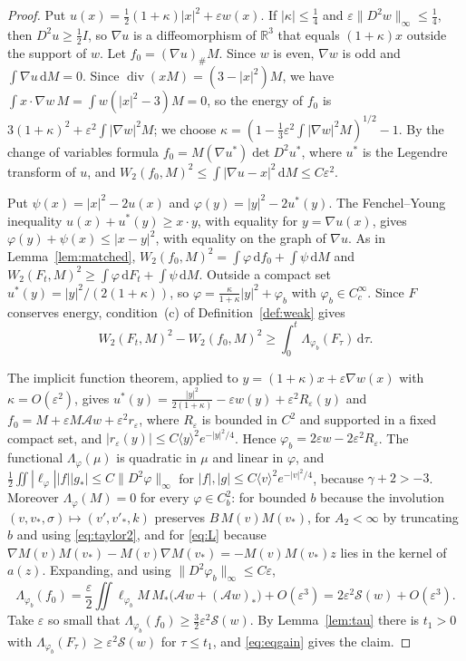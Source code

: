 \documentclass[11pt]{amsart}
\theoremstyle{definition}
\newcommand{\RR}{\mathbb{R}}
\newcommand{\dd}{\,\mathrm{d}}
\newcommand{\jb}[1]{\langle #1\rangle}
\begin{document}
\begin{proof}
Put $u(x)=\frac12(1+\kappa)|x|^2+\varepsilon w(x)$. If $|\kappa|\le\frac14$ and $\varepsilon\|D^2w\|_\infty\le\frac14$, then $D^2u\ge\frac12I$, so $\nabla u$ is a diffeomorphism of $\RR^3$ that equals $(1+\kappa)x$ outside the support of $w$. Let $f_0=(\nabla u)_\#M$. Since $w$ is even, $\nabla w$ is odd and $\int\nabla u\dd M=0$. Since $\operatorname{div}(xM)=(3-|x|^2)M$, we have $\int x\cdot\nabla w\,M=\int w(|x|^2-3)M=0$, so the energy of $f_0$ is $3(1+\kappa)^2+\varepsilon^2\int|\nabla w|^2M$; we choose $\kappa=(1-\frac13\varepsilon^2\int|\nabla w|^2M)^{1/2}-1$. By the change of variables formula $f_0=M(\nabla u^*)\det D^2u^*$, where $u^*$ is the Legendre transform of $u$, and $W_2(f_0,M)^2\le\int|\nabla u-x|^2\dd M\le C\varepsilon^2$.

Put $\psi(x)=|x|^2-2u(x)$ and $\varphi(y)=|y|^2-2u^*(y)$. The Fenchel--Young inequality $u(x)+u^*(y)\ge x\cdot y$, with equality for $y=\nabla u(x)$, gives $\varphi(y)+\psi(x)\le|x-y|^2$, with equality on the graph of $\nabla u$. As in Lemma~\ref{lem:matched}, $W_2(f_0,M)^2=\int\varphi\dd f_0+\int\psi\dd M$ and $W_2(F_t,M)^2\ge\int\varphi\dd F_t+\int\psi\dd M$. Outside a compact set $u^*(y)=|y|^2/(2(1+\kappa))$, so $\varphi=\frac{\kappa}{1+\kappa}|y|^2+\varphi_b$ with $\varphi_b\in C^\infty_c$. Since $F$ conserves energy, condition~(c) of Definition~\ref{def:weak} gives
\begin{equation}\label{eq:eqgain}
W_2(F_t,M)^2-W_2(f_0,M)^2\ge\int_0^t\Lambda_{\varphi_b}(F_\tau)\dd\tau .
\end{equation}

The implicit function theorem, applied to $y=(1+\kappa)x+\varepsilon\nabla w(x)$ with $\kappa=O(\varepsilon^2)$, gives $u^*(y)=\frac{|y|^2}{2(1+\kappa)}-\varepsilon w(y)+\varepsilon^2R_\varepsilon(y)$ and $f_0=M+\varepsilon M\mathcal Aw+\varepsilon^2r_\varepsilon$, where $R_\varepsilon$ is bounded in $C^2$ and supported in a fixed compact set, and $|r_\varepsilon(y)|\le C\jb{y}^2e^{-|y|^2/4}$. Hence $\varphi_b=2\varepsilon w-2\varepsilon^2R_\varepsilon$. The functional $\Lambda_\varphi(\mu)$ is quadratic in $\mu$ and linear in $\varphi$, and $\frac12\iint|\ell_\varphi||f||g_*|\le C\|D^2\varphi\|_\infty$ for $|f|,|g|\le C\jb{v}^2e^{-|v|^2/4}$, because $\gamma+2>-3$. Moreover $\Lambda_\varphi(M)=0$ for every $\varphi\in C^2_b$: for bounded $b$ because the involution $(v,v_*,\sigma)\mapsto(v',v'_*,k)$ preserves $B\,M(v)M(v_*)$, for $A_2<\infty$ by truncating $b$ and using \eqref{eq:taylor2}, and for \eqref{eq:L} because $\nabla M(v)M(v_*)-M(v)\nabla M(v_*)=-M(v)M(v_*)z$ lies in the kernel of $a(z)$. Expanding, and using $\|D^2\varphi_b\|_\infty\le C\varepsilon$,
\[
\Lambda_{\varphi_b}(f_0)=\frac\varepsilon2\iint\ell_{\varphi_b}M\,M_*\big(\mathcal Aw+(\mathcal Aw)_*\big)+O(\varepsilon^3)=2\varepsilon^2\mathcal S(w)+O(\varepsilon^3).
\]
Take $\varepsilon$ so small that $\Lambda_{\varphi_b}(f_0)\ge\frac32\varepsilon^2\mathcal S(w)$. By Lemma~\ref{lem:tau} there is $t_1>0$ with $\Lambda_{\varphi_b}(F_\tau)\ge\varepsilon^2\mathcal S(w)$ for $\tau\le t_1$, and \eqref{eq:eqgain} gives the claim.
\end{proof}
\end{document}
